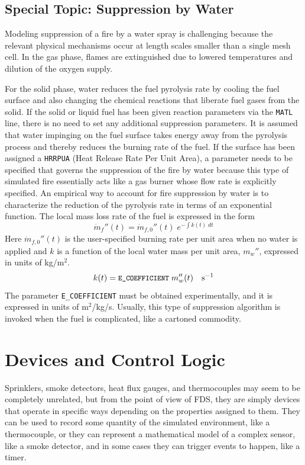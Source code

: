 \documentclass[11pt]{book}
\newcommand{\ct}{\tt\small}
\newcommand{\dm}{\dot{m}}
\newcommand{\be}{\begin{equation}}
\newcommand{\ee}{\end{equation}}
\begin{document}
\clearpage

\section{Special Topic: Suppression by Water}
\label{info:suppression}

Modeling suppression of a fire by a water spray is challenging because
the relevant physical mechanisms occur at length scales smaller than a
single mesh cell. In the gas phase, flames are extinguished due to lowered
temperatures and dilution of the oxygen supply.

For the solid phase,
water reduces the fuel pyrolysis rate by cooling the fuel surface and also
changing the chemical reactions that liberate fuel gases from the solid.
If the solid or liquid fuel has been given reaction parameters via the {\ct MATL} line, there is no
need to set any additional suppression parameters. It is assumed that
water impinging on the fuel surface takes energy away from the
pyrolysis process and thereby reduces the burning rate of the fuel.
If the surface has been assigned a {\ct HRRPUA} (Heat Release Rate Per Unit Area),
a parameter needs to be specified that governs the suppression of the fire by water because this type of simulated
fire essentially acts like a gas burner whose flow rate is explicitly specified.
An empirical way to account for fire suppression by water
is to characterize the reduction of the pyrolysis rate in terms
of an exponential function. The local mass loss rate of the
fuel is expressed in the form
\be \dm_f''(t) = \dm_{f,0}''(t) \; e^{-\int k(t) \; dt} \label{nistexting} \ee
Here $\dm_{f,0}''(t)$ is the user-specified burning rate per unit
area when no water is applied and $k$ is a function of the local water
mass per unit area, $m_w''$, expressed in units of kg/m$^2$.
\be
k(t) = \hbox{\ct E\_COEFFICIENT} \; m_w''(t) \quad          \hbox{s}^{-1}
\ee
The parameter {\ct E\_COEFFICIENT} must be obtained experimentally, and
it is expressed in units of m$^2$/kg/s. Usually, this type of suppression
algorithm is invoked when the fuel is complicated, like a cartoned commodity.






\chapter{Devices and Control Logic}

Sprinklers, smoke detectors, heat flux gauges, and thermocouples
may seem to be completely unrelated, but from the point of view
of FDS, they are simply devices that operate in specific ways depending
on the properties assigned to them. They can be used to record some
quantity of the simulated environment, like a thermocouple, or they can represent a mathematical model
of a complex sensor, like a smoke detector,
and in some cases they can trigger events to happen, like a timer.
\end{document}
